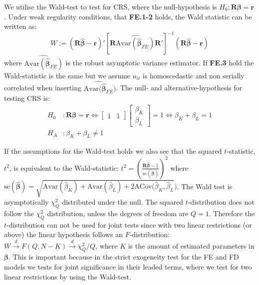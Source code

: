 
We utilise the Wald-test to test for CRS, where the null-hypothesis is $H_0: \mathbf{R}\boldsymbol{\beta}=\mathbf{r}$. Under weak regularity conditions, that \textbf{FE.1-2} holds, the Wald statistic can be written as:
\begin{equation*}
    W:=(\mathbf{R}{\boldsymbol{\hat\beta}}-\mathbf{r})'
    [\mathbf{R}\widehat{\text{Avar}({\boldsymbol{\hat{\beta}}}_{FE})}\mathbf{R}']^{-1}
    (\mathbf{R} \boldsymbol{\hat{\beta}}-\mathbf{r})
\end{equation*}
where $\widehat{\text{Avar}({\boldsymbol{\hat{\beta}}}_{FE})}$ is the robust asymptotic variance estimator. If \textbf{FE.3} hold the Wald-statistic is the same but we assume $u_{it}$ is homoscedastic and non serially correlated when inserting $\widehat{\text{Avar}(\bm{\hat\beta}_{FE}})$. The null- and alternative-hypothesis for testing CRS is:
\begin{align*}
  H_0 & : \mathbf{R}\boldsymbol{\beta}=\mathbf{r} \Leftrightarrow
\begin{bmatrix} 1&1 \end{bmatrix} \begin{bmatrix} \beta_K \\ \beta_L \end{bmatrix} =1
\Leftrightarrow \beta_K+\beta_L=1  \\
H_A & : \beta_K+\beta_L \neq 1
\end{align*}

If the assumptions for the Wald-test holds we also see that the squared $t$-statistic, $t^2$, is equivalent to the Wald-statistic: $t^2=(\frac{\textbf{R}\bm{\hat\beta}-1}{se(\bm{\hat\beta})})^2$ where $\text{se}(\bm{\hat\beta})=\sqrt{\text{Avar}(\hat\beta_K)+\text{Avar}(\hat\beta_L)+2\text{ACov}({\hat\beta_K,\hat\beta_L}})$. The Wald test is asymptotically $\chi^2_Q$ distributed under the null. The squared $t$-distribution does not follow the $\chi^2_Q$ distribution, unless the degrees of freedom are $Q=1$. Therefore the $t$-distribution can not be used for joint tests since with two linear restrictions (or above) the linear hypothesis follows an $F$-distribution: $W\xrightarrow{d}F(Q,N-K)\xrightarrow{d}\chi^2_Q/Q$, where $K$ is the amount of estimated parameters in $\bm\beta$.
This is important because in the strict exogeneity test for the FE and FD models we tests for joint significance in their leaded terms, where we test for two linear restrictions by using the Wald-test. 

